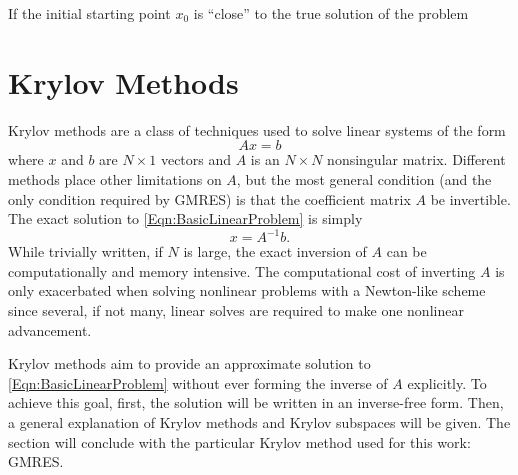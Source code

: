 \documentclass[Prelim,12pt]{WisconsinThesis}
\newcommand{\by}    {\!\times\!}
\begin{document}
If the initial starting point $x_0$ is ``close'' to the true solution of the problem





\section{Krylov Methods}
Krylov methods are a class of techniques used to solve linear systems of the form
\begin{equation}
    A x = b
    \label{Eqn:BasicLinearProblem}
\end{equation}
where $x$ and $b$ are $N \by 1$ vectors and $A$ is an $N \by N$ nonsingular matrix.
Different methods place other limitations on $A$, but the most general condition (and the only condition required by GMRES) is that the coefficient matrix $A$ be invertible.
The exact solution to \cref{Eqn:BasicLinearProblem} is simply
\begin{equation}
    x = A^{-1} b.
    \label{Eqn:BasicLinearSolution}
\end{equation}
While trivially written, if $N$ is large, the exact inversion of $A$ can be computationally and memory intensive.
The computational cost of inverting $A$ is only exacerbated when solving nonlinear problems with a Newton-like scheme since several, if not many, linear solves are required to make one nonlinear advancement.

Krylov methods aim to provide an approximate solution to \cref{Eqn:BasicLinearProblem} without ever forming the inverse of $A$ explicitly.
To achieve this goal, first, the solution will be written in an inverse-free form.
Then, a general explanation of Krylov methods and Krylov subspaces will be given.
The section will conclude with the particular Krylov method used for this work: GMRES.
\end{document}
